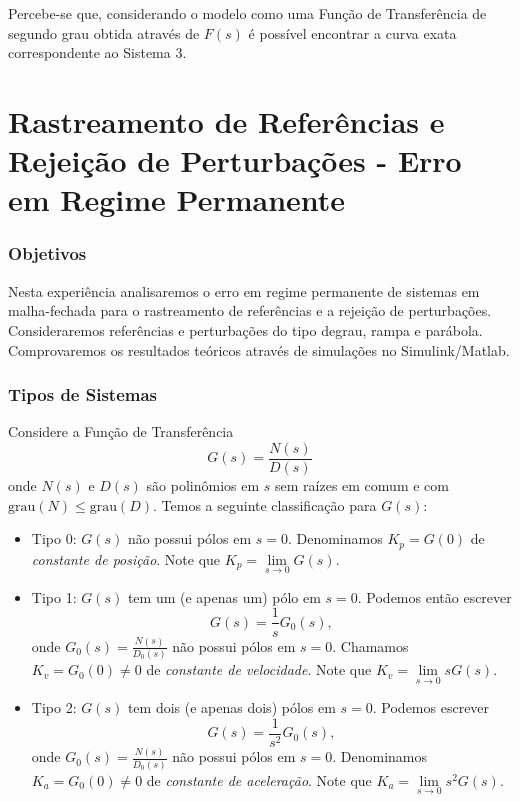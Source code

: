 \documentclass[
]{book}
\providecommand{\tightlist}{%
  \setlength{\itemsep}{0pt}\setlength{\parskip}{0pt}}
\begin{document}
Percebe-se que, considerando o modelo como uma Função de Transferência de segundo grau obtida através de \(F(s)\) é possível encontrar a curva exata correspondente ao Sistema 3.

\hypertarget{rastreamento-de-referuxeancias-e-rejeiuxe7uxe3o-de-perturbauxe7uxf5es---erro-em-regime-permanente}{%
\chapter{Rastreamento de Referências e Rejeição de Perturbações - Erro em Regime Permanente}\label{rastreamento-de-referuxeancias-e-rejeiuxe7uxe3o-de-perturbauxe7uxf5es---erro-em-regime-permanente}}

\hypertarget{objetivos}{%
\subsection*{Objetivos}\label{objetivos}}

Nesta experiência analisaremos o erro em regime permanente de sistemas em malha-fechada para o rastreamento de referências e a rejeição de perturbações. Consideraremos referências e perturbações do tipo degrau, rampa e parábola. Comprovaremos os resultados teóricos através de simulações no Simulink/Matlab.

\hypertarget{tipos-de-sistemas}{%
\subsection*{Tipos de Sistemas}\label{tipos-de-sistemas}}

Considere a Função de Transferência
\[
G(s) = \frac {N(s)}{D(s)}
\]
onde \(N(s)\) e \(D(s)\) são polinômios em \(s\) sem raízes em comum e com \(\text{grau}(N) \leq \text{grau}(D)\). Temos a seguinte classificação para \(G(s)\):

\begin{itemize}
\tightlist
\item
  Tipo 0: \(G(s)\) não possui pólos em \(s=0\). Denominamos \(K_p = G(0)\) de \emph{constante de posição}. Note que \(K_p = \lim\limits_{s \to 0} G(s)\).
\item
  Tipo 1: \(G(s)\) tem um (e apenas um) pólo em \(s=0\). Podemos então escrever \[G(s) = \frac {1}{s}G_0(s),\] onde \(G_0(s) = \frac {N(s)}{D_0(s)}\) não possui pólos em \(s=0\). Chamamos \(K_v= G_0(0) \neq 0\) de \emph{constante de velocidade}. Note que \(K_v = \lim\limits_{s \to 0} sG(s)\).
\item
  Tipo 2: \(G(s)\) tem dois (e apenas dois) pólos em \(s=0\). Podemos escrever \[G(s) = \frac {1}{s^2}G_0(s),\] onde \(G_0(s) = \frac {N(s)}{D_0(s)}\) não possui pólos em \(s=0\). Denominamos \(K_a = G_0(0) \neq 0\) de \emph{constante de aceleração}. Note que \(K_a =\lim\limits_{s \to 0} s^2G(s)\).
\end{itemize}
\end{document}
